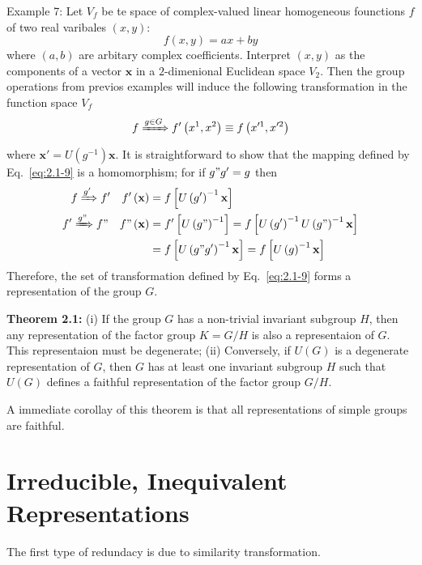 \textrm{Example 7}: Let $V_{f}$ be te space of complex-valued linear homogeneous founctions $f$ of two real varibales $\left(x,y\right)$:
\begin{equation}
  \label{eq:2.1-8}
  f\left(x,y\right) = a x + by
\end{equation}
where $\left(a,b\right)$ are arbitary complex coefficients.
Interpret $\left(x,y\right)$ as the components of a vector $\mathbf{x}$ in a $2$-dimenional Euclidean space $V_{2}$.
Then the group operations from previos examples will induce the following transformation in the function space $V_{f}$
\begin{equation}
\label{eq:2.1-9}
f \xRightarrow{g \in G} f'\left(x^{1},x^{2}\right) \equiv f \left(x'^{1},x'^{2}\right)
\end{equation}
where $\mathbf{x}' = U\left(g^{-1}\right) \mathbf{x}$.
It is straightforward to show that the mapping defined by Eq.~\eqref{eq:2.1-9} is a homomorphism; for if $g" g' = g$ then
\begin{align}
\label{eq:2.1-10}
f \xRightarrow{g'} f' ~ ~ ~ f' \left(\mathbf{x}\right) &= f \left[ U\left(g'\right)^{-1} \mathbf{x} \right] \\ \nonumber
f' \xRightarrow{g"} f" ~ ~ ~ f"\left( \mathbf{x} \right) &= f' \left[ U\left(g"\right)^{-1} \right] = f \left[U\left(g'\right)^{-1} U\left(g"\right)^{-1} \mathbf{x} \right] \\ \nonumber
  &= f\left[U\left(g"g'\right)^{-1} \mathbf{x}\right] = f\left[ U\left(g\right)^{-1} \mathbf{x}\right]
\end{align}
Therefore, the set of transformation defined by Eq.~\eqref{eq:2.1-9} forms a representation of the group $G$.

\textbf{Theorem 2.1:} (i) If the group $G$ has a non-trivial invariant subgroup $H$, then any representation of the factor group $K=G/H$ is also a representaion of $G$.
This representaion must be degenerate; (ii) Conversely, if $U \left( G \right)$ is a degenerate representation of $G$, then $G$ has at least one invariant subgroup $H$ such that $U \left( G \right)$ defines a faithful representation of the factor group $G/H$.

A immediate corollay of this theorem is that all representations of simple groups are faithful.

\section{Irreducible, Inequivalent Representations}
The first type of redundacy is due to similarity transformation.

